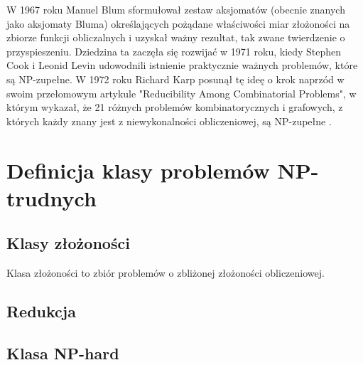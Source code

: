 W 1967 roku Manuel Blum sformułował zestaw aksjomatów (obecnie znanych jako aksjomaty Bluma) określających pożądane właściwości miar złożoności na zbiorze funkcji obliczalnych i uzyskał ważny rezultat, tak zwane twierdzenie o przyspieszeniu. Dziedzina ta zaczęła się rozwijać w 1971 roku, kiedy Stephen Cook i Leonid Levin udowodnili istnienie praktycznie ważnych problemów, które są NP-zupełne. W 1972 roku Richard Karp posunął tę ideę o krok naprzód w swoim przełomowym artykule "Reducibility Among Combinatorial Problems", w którym wykazał, że 21 różnych problemów kombinatorycznych i grafowych, z których każdy znany jest z niewykonalności obliczeniowej, są NP-zupełne \cite{Karp86}.

\section{Definicja klasy problemów NP-trudnych}

\subsection{Klasy złożoności}
Klasa złożoności to zbiór problemów o zbliżonej złożoności obliczeniowej. 

\subsection{Redukcja}

\subsection{Klasa NP-hard}


